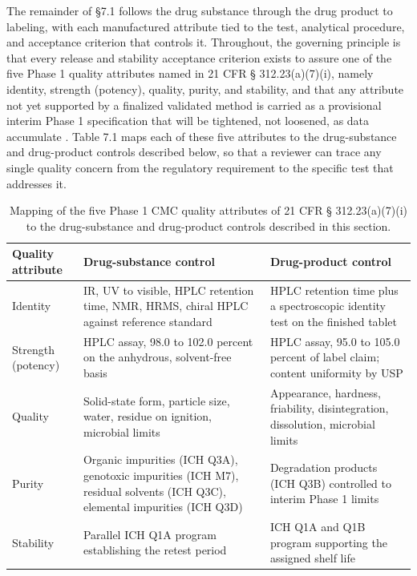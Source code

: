 The remainder of \S 7.1 follows the drug substance through the drug product to
labeling, with each manufactured attribute tied to the test, analytical
procedure, and acceptance criterion that controls it. Throughout, the governing
principle is that every release and stability acceptance criterion exists to
assure one of the five Phase 1 quality attributes named in 21 CFR \S
312.23(a)(7)(i), namely identity, strength (potency), quality, purity, and
stability, and that any attribute not yet supported by a finalized validated
method is carried as a provisional interim Phase 1 specification that will be
tightened, not loosened, as data accumulate \cite{phase1guidance}. Table 7.1
maps each of these five attributes to the drug-substance and drug-product
controls described below, so that a reviewer can trace any single quality concern
from the regulatory requirement to the specific test that addresses it.

\begin{table}[t]
\centering
\caption{Mapping of the five Phase 1 CMC quality attributes of 21 CFR \S
312.23(a)(7)(i) to the drug-substance and drug-product controls described in this
section.}
\label{tab:cmc-attribute-map}
\begin{tabularx}{\textwidth}{L{3.0cm} Y Y}
\toprule
\textbf{Quality attribute} & \textbf{Drug-substance control} & \textbf{Drug-product control} \\
\midrule
Identity & IR, UV to visible, HPLC retention time, NMR, HRMS, chiral HPLC against reference standard & HPLC retention time plus a spectroscopic identity test on the finished tablet \\
Strength (potency) & HPLC assay, 98.0 to 102.0 percent on the anhydrous, solvent-free basis & HPLC assay, 95.0 to 105.0 percent of label claim; content uniformity by USP \\
Quality & Solid-state form, particle size, water, residue on ignition, microbial limits & Appearance, hardness, friability, disintegration, dissolution, microbial limits \\
Purity & Organic impurities (ICH Q3A), genotoxic impurities (ICH M7), residual solvents (ICH Q3C), elemental impurities (ICH Q3D) & Degradation products (ICH Q3B) controlled to interim Phase 1 limits \\
Stability & Parallel ICH Q1A program establishing the retest period & ICH Q1A and Q1B program supporting the assigned shelf life \\
\bottomrule
\end{tabularx}
\end{table}

